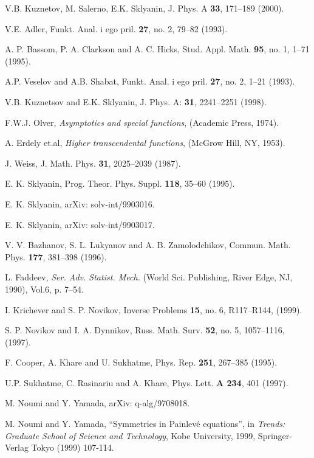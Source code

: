 \documentclass[a4paper,11pt]{article}
\begin{document}
\begin{thebibliography}{99}

V.B. Kuznetov, M. Salerno, E.K. Sklyanin,
    J. Phys. A {\bf 33}, 171--189 (2000).

V.E. Adler,
    Funkt. Anal. i ego pril. {\bf 27}, no. 2, 79--82 (1993).

A. P. Bassom, P. A. Clarkson and A. C. Hicks,
    Stud. Appl. Math. {\bf 95}, no. 1, 1--71 (1995).

A.P. Veselov and A.B. Shabat,
    Funkt. Anal. i ego pril. {\bf 27}, no. 2, 1--21 (1993).

V.B. Kuznetsov and E.K. Sklyanin,
    J. Phys. A: {\bf 31}, 2241--2251 (1998).

F.W.J. Olver,
    {\it Asymptotics and special functions}, (Academic Press, 1974).

A. Erdely et.al,
    {\it Higher transcendental functions}, (McGrow Hill, NY, 1953).

J. Weiss,
    J. Math. Phys. {\bf 31}, 2025--2039 (1987).

E. K. Sklyanin,
    Prog. Theor. Phys. Suppl. {\bf 118}, 35--60 (1995).

E. K. Sklyanin, arXiv: solv-int/9903016.

E. K. Sklyanin, arXiv: solv-int/9903017.

V. V. Bazhanov, S. L. Lukyanov and A. B. Zamolodchikov,
    Commun. Math. Phys. {\bf 177}, 381--398 (1996).

L. Faddeev,
    {\it Ser. Adv. Statist. Mech. } (World Sci. Publishing, River Edge, NJ, 1990),
    Vol.6, p. 7--54.

I. Krichever and S. P.  Novikov,
    Inverse Problems {\bf 15}, no. 6, R117--R144, (1999).

S. P. Novikov and I. A.  Dynnikov,
    Russ. Math. Surv. {\bf 52}, no. 5, 1057--1116, (1997).

F. Cooper, A. Khare and U. Sukhatme,
    Phys. Rep. {\bf 251}, 267--385 (1995).

U.P. Sukhatme, C. Rasinariu and A. Khare,
    Phys. Lett. {\bf A 234}, 401 (1997).

M. Noumi and Y. Yamada, arXiv: q-alg/9708018.

M. Noumi and Y. Yamada, ``Symmetries in Painlev\'{e} equations'', in
{\em Trends: Graduate School of Science and Technology}, Kobe University, 1999,
Springer-Verlag Tokyo (1999) 107-114.

\end{thebibliography}
\end{document}
